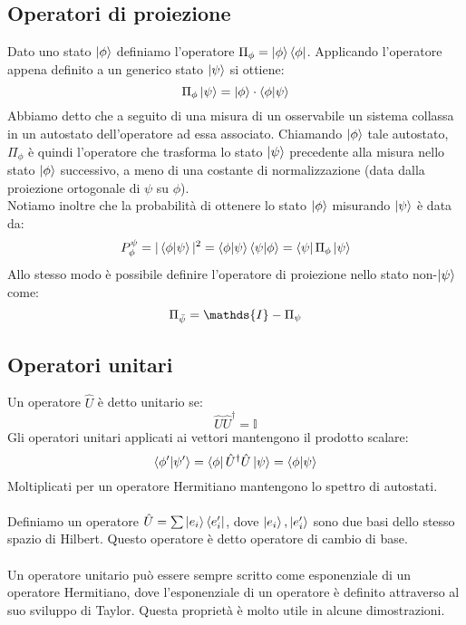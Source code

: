 \documentclass{article}
\begin{document}
\subsection{Operatori di proiezione}
Dato uno stato $\ket{\phi}$ definiamo l'operatore $\Pi_\phi=\ket{\phi}\bra{\phi}$. Applicando l'operatore appena definito a un generico stato $\ket{\psi}$ si ottiene:
$$ \Pi_\phi\ket{\psi}=\ket{\phi}\cdot \bra{\phi}\ket{\psi} $$
Abbiamo detto che a seguito di una misura di un osservabile un sistema collassa in un autostato dell'operatore ad essa associato. Chiamando $\ket{\phi}$ tale autostato, $\Pi_\phi$ è quindi l'operatore che trasforma lo stato $\ket{\psi}$ precedente alla misura nello stato $\ket{\phi}$ successivo, a meno di una costante di normalizzazione (data dalla proiezione ortogonale di $\psi$ su $\phi$).\\
Notiamo inoltre che la probabilità di ottenere lo stato $\ket{\phi}$ misurando $\ket{\psi}$ è data da:
$$ P^\psi_\phi=|\bra{\phi}\ket{\psi}|^2=\bra{\phi}\ket{\psi}\bra{\psi}\ket{\phi}= \bra{\psi}\Pi_\phi\ket{\psi}$$
Allo stesso modo è possibile definire l'operatore di proiezione nello stato non-$\ket{\psi}$ come:
$$\Pi_{\Bar{\psi}}=\mathds{I}-\Pi_\psi$$

\subsection{Operatori unitari}
Un operatore $\hat{U}$ è detto unitario se:
$$ \hat{U}\hat{U}^\dagger=\mathds{I} $$
Gli operatori unitari applicati ai vettori mantengono il prodotto scalare:
$$ \bra{\phi'}\ket{\psi'}=\bra{\phi}\hat{U}^\dagger\hat{U}\ket{\psi}=\bra{\phi}\ket{\psi} $$
Moltiplicati per un operatore Hermitiano mantengono lo spettro di autostati.\\\\
Definiamo un operatore $\hat{U}=\sum\ket{e_i}\bra{e'_i}$, dove $\ket{e_i},\ket{e_i'}$ sono due basi dello stesso spazio di Hilbert. Questo operatore è detto operatore di cambio di base.\\\\
Un operatore unitario può essere sempre scritto come esponenziale di un operatore Hermitiano, dove l'esponenziale di un operatore è definito attraverso al suo sviluppo di Taylor. Questa proprietà è molto utile in alcune dimostrazioni.
\end{document}
